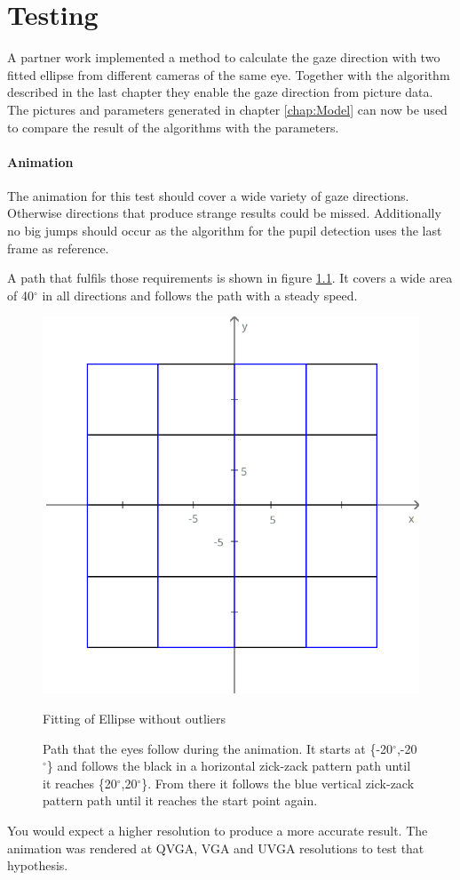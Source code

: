 \chapter{Testing}
\label{chap:results}

A partner work implemented a method to calculate the gaze direction with two fitted ellipse from different cameras of the same eye. Together with the algorithm described in the last chapter they enable the gaze direction from picture data. The pictures and parameters generated in chapter \ref{chap:Model} can now be used to compare the result of the algorithms with the parameters. 
\subsubsection{Animation}
\label{sec:animation}

The animation for this test should cover a wide variety of gaze directions. Otherwise directions that produce strange results could be missed. Additionally no big jumps should occur as the algorithm for the pupil detection uses the last frame as reference. 

A path that fulfils those requirements is shown in figure \ref{fig:path}. It covers a wide area of 40$^{\circ}$ in all directions and follows the path with a steady speed.

\begin{figure} [H]
		\centering
		\includegraphics[width=0.4\linewidth]{images/grid.png}
		\caption{Fitting of Ellipse without outliers}
		\label{fig:path}
	
	\caption{Path that the eyes follow during the animation. It starts at \{-20$^{\circ}$,-20$^{\circ}$\} and follows the black in a horizontal zick-zack pattern path until it reaches \{20$^{\circ}$,20$^{\circ}$\}. From there it follows the blue vertical zick-zack pattern path until it reaches the start point again. }	
\end{figure}

You would expect a higher resolution to produce a more accurate result. The animation was rendered at QVGA, VGA and UVGA resolutions to test that hypothesis. 
